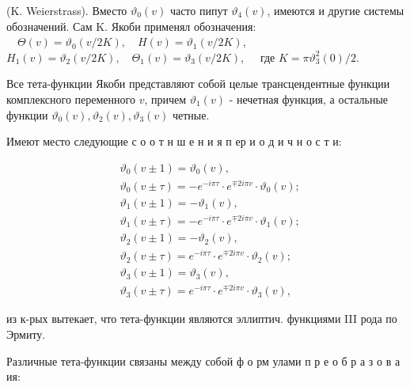 \documentclass[10pt]{article}
\begin{document}
(K. Weierstrass). Вместо $\vartheta_{0}(v)$ часто пипут $\vartheta_{4}(v)$, имеются и другие системы обозначений. Сам $\mathrm{K}$. Якоби применял обозначения: $\quad \Theta(v)=\vartheta_{0}(v / 2 K), \quad H(v)=\vartheta_{1}(v / 2 K)$, $H_{1}(v)=\vartheta_{2}(v / 2 K), \quad \Theta_{1}(v)=\vartheta_{3}(v / 2 K), \quad$ где $K=\pi \vartheta_{3}^{2}(0) / 2$.



Все тета-функции Якоби представляют собой целые трансцендентные функции комплексного переменного $v$, причем $\vartheta_{1}(v)$ - нечетная функция, а остальные функции $\vartheta_{0}(v), \vartheta_{2}(v), \vartheta_{3}(v)$ четные.



Имеют место следующие с о о т н ш е н и я п ер и о д и ч н о с т и:



\[

\begin{aligned}

& \vartheta_{0}(v \pm 1)=\vartheta_{0}(v), \\

& \vartheta_{0}(v \pm \tau)=-e^{-i \pi \tau} \cdot e^{\mp 2 i \pi v} \cdot \vartheta_{0}(v) ; \\

& \vartheta_{1}(v \pm 1)=-\vartheta_{1}(v), \\

& \vartheta_{1}(v \pm \tau)=-e^{-i \pi \tau} \cdot e^{\mp 2 i \pi v} \cdot \vartheta_{1}(v) ; \\

& \vartheta_{2}(v \pm 1)=-\vartheta_{2}(v), \\

& \vartheta_{2}(v \pm \tau)=e^{-i \pi \tau} \cdot e^{\mp 2 i \pi v} \cdot \vartheta_{2}(v) ; \\

& \vartheta_{3}(v \pm 1)=\vartheta_{3}(v), \\

& \vartheta_{3}(v \pm \tau)=e^{-i \pi \tau} \cdot e^{\mp 2 i \pi v} \cdot \vartheta_{3}(v),

\end{aligned}

\]



из к-рых вытекает, что тета-функции являются эллиптич. функциями III рода по Эрмиту.



Различные тета-функции связаны между собой ф о рм улами п р е о б р а з о в а ия:
\end{document}
